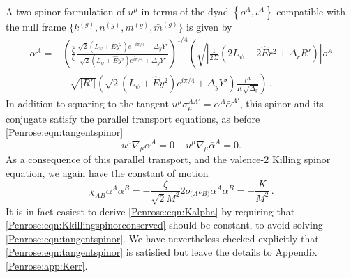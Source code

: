 A two-spinor formulation of $u^{\mu}$ in terms of the dyad $\left\lbrace o^A , \iota^A \right\rbrace$ compatible with the null frame $\lbrace k^{(g)},n^{(g)},m^{(g)},\bar{m}^{(g)} \rbrace$ is given by
\begin{equation}\label{Penrose:eqn:Kalpha}
\begin{aligned}
\alpha^A = & \left(\frac{\bar{\zeta}}{\zeta} \, \frac{\sqrt{2}(L_{\psi}+\hat{E}y^2)e^{-i\pi/4}+\Delta_y Y'}{\sqrt{2}(L_{\psi}+\hat{E}y^2)e^{i\pi/4}+\Delta_y Y'}\right)^{1/4}\left(\sqrt{\left|\frac{1}{2\Sigma }\left(2L_{\psi}-2\hat{E}r^2+\Delta_r R'\right)\right|}o^A  \right. \\  &- \left.\sqrt{\left|R'\right|} \left(\sqrt{2}(L_{\psi}+\hat{E}y^2)e^{i\pi/4}+\Delta_y Y'\right)\frac{\iota^A}{K \sqrt{\Delta_y}}  \right)\, .
\end{aligned}
\end{equation}
In addition to squaring to the tangent $u^{\mu} \sigma_{\mu}^{AA'} = \alpha^A \bar{\alpha}^{A'}$, this spinor and its conjugate satisfy the parallel transport equations, as before \eqref{Penrose:eqn:tangentspinor}
\begin{equation}
u^{\mu} \nabla_{\mu} \alpha^A = 0 \, \quad  u^{\mu} \nabla_{\mu} \bar{\alpha}^A = 0 .
\end{equation}
As a consequence of this parallel transport, and the valence-2 Killing spinor equation, we again have the constant of motion
\begin{equation}\label{Penrose:eqn:Kkillingspinorconserved}
\chi_{AB} \alpha^A \alpha^B =  -\frac{\zeta}{\sqrt{2} M^2} 2 o_{(A} \iota_{B)}\alpha^A \alpha^B = - \frac{K}{M^2} \, .
\end{equation}
It is in fact easiest to derive \eqref{Penrose:eqn:Kalpha} by requiring that \eqref{Penrose:eqn:Kkillingspinorconserved} should be constant, to avoid solving \eqref{Penrose:eqn:tangentspinor}. We have nevertheless checked explicitly that \eqref{Penrose:eqn:tangentspinor} is satisfied but leave the details to Appendix \ref{Penrose:app:Kerr}.

